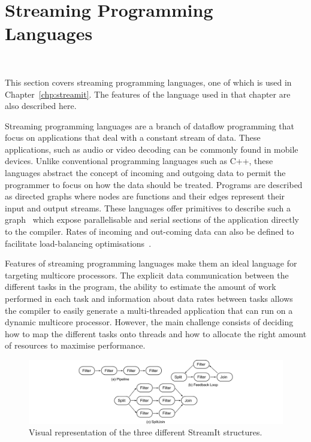\section{Streaming Programming Languages}~\label{sec:bg:stream}

This section covers streaming programming languages, one of which is used in Chapter~\ref{chp:streamit}.
The features of the language used in that chapter are also described here.

Streaming programming languages are a branch of dataflow programming that focus on applications that deal with a constant stream of data.
These applications, such as audio or video decoding can be commonly found in mobile devices.
Unlike conventional programming languages such as C++, these languages abstract the concept of incoming and outgoing data to permit the programmer to focus on how the data should be treated.
Programs are described as directed graphs where nodes are functions and their edges represent their input and output streams. 
These languages offer primitives to describe such a graph~\cite{theis2002streamit} which expose parallelisable and serial sections of the application directly to the compiler. 
Rates of incoming and out-coming data can also be defined to facilitate load-balancing optimisations~\cite{chen2005rawstream}.

Features of streaming programming languages make them an ideal language for targeting multicore processors.
The explicit data communication between the different tasks in the program, the ability to estimate the amount of work performed in each task and information about data rates between tasks allows the compiler to easily generate a multi-threaded application that can run on a dynamic multicore processor.
However, the main challenge consists of deciding how to map the different tasks onto threads and how to allocate the right amount of resources to maximise performance.


\begin{figure}[t]
    \centering
    \includegraphics[width=1\textwidth]{streamit-paper/graphics/streamit_types.pdf}
    \caption{Visual representation of the three different StreamIt structures.}
    \label{fig:streamittypes}
		\vspace{-1em}

\end{figure}

